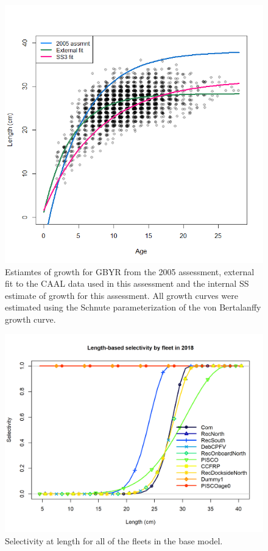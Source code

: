 \documentclass[12pt,]{article}
\begin{document}
\FloatBarrier

\begin{figure}
\centering
\includegraphics{Figures/growth_compare.png}
\caption{Estiamtes of growth for GBYR from the 2005 assessment, external
fit to the CAAL data used in this assessment and the internal SS
estimate of growth for this assessment. All growth curves were estimated
using the Schnute parameterization of the von Bertalanffy growth curve.
\label{fig:growth_compare}}
\end{figure}

\FloatBarrier

\begin{figure}
\centering
\includegraphics{r4ss/plots_mod1/sel01_multiple_fleets_length1.png}
\caption{Selectivity at length for all of the fleets in the base model.
\label{fig:sel01_multiple_fleets_length1}}
\end{figure}
\end{document}
